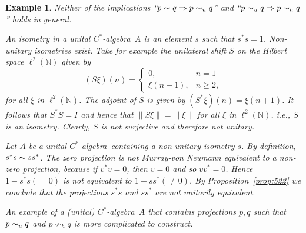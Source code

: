 \documentclass{book}
\newtheorem{example}[definition]{Example}
\def\cstar{\(C^*\)-algebra}
\begin{document}
\begin{example}\label{example:529}
  Neither of the implications ``\(p\thicksim q\Rightarrow p\thicksim_u q\)'' and 
  ``\(p\thicksim_u q\Rightarrow p\thicksim_h q\)'' holds in general.\par
  An \textnormal{isometry} in a unital \cstar\ \(A\) is an element \(s\) such that \(s^*s=1\).
  Non-unitary isometries exist. Take for example the \textnormal{unilateral shift} \(S\) on the Hilbert space
  \(\ell^2(\mathbb{N})\) given by
  \[
    (S\xi)(n)=\begin{cases}
      0,& n=1\\
      \xi(n-1),& n\geq 2,
    \end{cases}
  \]
  for all \(\xi\) in \(\ell^2(\mathbb{N})\). The adjoint of \(S\) is given by \((S^*\xi)(n)=\xi(n+1)\).
  It follows that \(S^*S=I\) and hence that \(\|S\xi\|=\|\xi\|\) for all \(\xi\) in \(\ell^2(\mathbb{N})\), i.e., \(S\)
  is an isometry. Clearly, \(S\) is not surjective and therefore not unitary.\par
  Let \(A\) be a unital \cstar\ containing a non-unitary isometry \(s\). By definition, \(s^*s\thicksim ss^*\). The zero projection is not Murray-von Neumann equivalent
  to a non-zero projection, because if \(v^*v=0\), then \(v=0\) and so \(vv^*=0\).
  Hence \(1-s^*s(=0)\) is not equivalent to \(1-ss^*(\neq 0)\). By Proposition~\ref{prop:522} 
  we conclude that the projections \(s^*s\) and \(ss^*\) are not unitarily equivalent.\par
  An example of a (unital) \cstar\ \(A\) that contains projections \(p, q\) such that \(p\thicksim_u q\) and \(p\nsim_h q\) is more complicated to construct.
\end{example}
\end{document}
